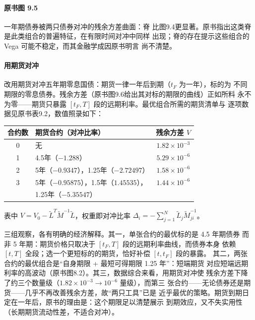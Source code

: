 \paragraph{原书图 9.5}\quad 一年期债券被两只债券对冲的残余方差曲面：脊
比图9.4更显著。原书指出这类脊是此类组合的普遍特征，在有限时间对冲中同样
出现；脊的存在提示这些组合的 Vega 可能不稳定，而其金融学成因原书明言
尚不清楚。

\paragraph{用期货对冲}
改用期货对冲五年期零息国债：期货一律一年后到期（$t_F$ 为一年），标的为
不同期限的零息债券。残余方差（原书图9.6给出其对标的期限的曲线）正如所料
永不为零——期货只暴露 $[t_F,T]$ 段的远期利率。最优组合所需的期货清单与
逐项数据见原书表9.2，数值照录如下：

\begin{center}
\begin{tabular}{clc}
\hline
合约数 & 期货合约（对冲比率） & 残余方差 $V$\\
\hline
0 & 无 & $1.82\times10^{-3}$\\
1 & 4.5年（$-1.288$） & $5.29\times10^{-6}$\\
2 & 5年（$-0.9347$），1.25年（$-2.72497$） & $1.58\times10^{-6}$\\
3 & 5年（$-0.95875$），1.5年（$1.45535$）， & $1.44\times10^{-6}$\\
  & \phantom{5年（$-0.95875$），}1.25年（$-5.35547$） & \\
\hline
\end{tabular}
\end{center}
表中 $V=V_0-\tilde{L}^{T}\tilde{M}^{-1}\tilde{L}$，权重即对冲比率
$\Delta_i=-\sum_{j=1}^{N}\tilde{L}_j\tilde{M}^{-1}_{ji}$。

三组观察，各有明确的经济解释。其一，单张合约的最优标的是 4.5 年期债券
而非 5 年期：期货价格只取决于 $[t_F,T]$ 段的远期利率曲线，而债券本身
依赖 $[t,T]$ 全段；选一个更短标的的期货，恰好补偿 $[t,t_F]$ 段的暴露。
其二，两张合约的最优组合是“自身期限 + 最短可得期限 1.25 年”：短端期货
对应短端远期利率的高波动（原书图8.2）。其三，数据综合来看，用期货对冲使
残余方差下降了约三个数量级（$1.82\times10^{-3}\to10^{-6}$ 量级），而第三
张合约——无论债券还是期货——几乎不再改善残余方差，故“两只工具”已是
近乎最优的策略。期货到期日定在一年后，原书的理由是：这个期限足以清楚展示
到期效应，又不失实用性（长期期货流动性差，不适合对冲）。

